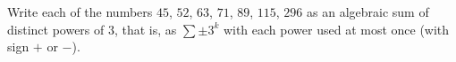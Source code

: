 Write each of the numbers $45$, $52$, $63$, $71$, $89$, $115$, $296$ as an algebraic sum of distinct powers of $3$, that is, as $\sum \pm3^k$ with each power used at most once (with sign $+$ or $-$).
